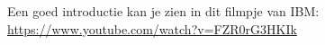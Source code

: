 Een goed introductie kan je zien in dit filmpje van IBM:
\url{https://www.youtube.com/watch?v=FZR0rG3HKIk}
